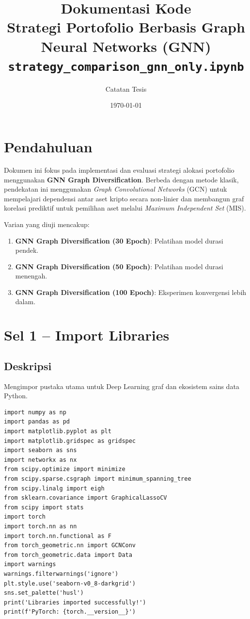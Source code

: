 \documentclass[12pt,a4paper]{article}
\title{\textbf{Dokumentasi Kode} \\ \large Strategi Portofolio Berbasis Graph Neural Networks (GNN) \\
\small \texttt{strategy\_comparison\_gnn\_only.ipynb}}
\author{Catatan Tesis}
\date{\today}
\begin{document}
\maketitle
\tableofcontents
\newpage

\section{Pendahuluan}
Dokumen ini fokus pada implementasi dan evaluasi strategi alokasi portofolio menggunakan 
\textbf{GNN Graph Diversification}. Berbeda dengan metode klasik, pendekatan ini 
menggunakan \textit{Graph Convolutional Networks} (GCN) untuk mempelajari dependensi 
antar aset kripto secara non-linier dan membangun graf korelasi prediktif untuk 
pemilihan aset melalui \textit{Maximum Independent Set} (MIS).

Varian yang diuji mencakup:
\begin{enumerate}
    \item \textbf{GNN Graph Diversification (30 Epoch)}: Pelatihan model durasi pendek.
    \item \textbf{GNN Graph Diversification (50 Epoch)}: Pelatihan model durasi menengah.
    \item \textbf{GNN Graph Diversification (100 Epoch)}: Eksperimen konvergensi lebih dalam.
\end{enumerate}

\section{Sel 1 -- Import Libraries}

\subsection{Deskripsi}
Mengimpor pustaka utama untuk Deep Learning graf dan ekosistem sains data Python.
\begin{lstlisting}[caption={Import libraries}]
import numpy as np
import pandas as pd
import matplotlib.pyplot as plt
import matplotlib.gridspec as gridspec
import seaborn as sns
import networkx as nx
from scipy.optimize import minimize
from scipy.sparse.csgraph import minimum_spanning_tree
from scipy.linalg import eigh
from sklearn.covariance import GraphicalLassoCV
from scipy import stats
import torch
import torch.nn as nn
import torch.nn.functional as F
from torch_geometric.nn import GCNConv
from torch_geometric.data import Data
import warnings
warnings.filterwarnings('ignore')
plt.style.use('seaborn-v0_8-darkgrid')
sns.set_palette('husl')
print('Libraries imported successfully!')
print(f'PyTorch: {torch.__version__}')
\end{lstlisting}
\end{document}
